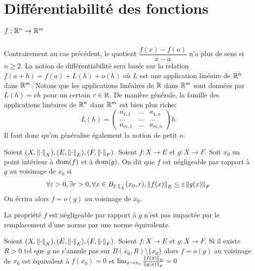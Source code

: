      \section{Différentiabilité des fonctions $f:\mathbb{R}^n\to\mathbb{R}^m$} 
     Contrairement au cas précédent, le quotient $\dfrac{f(x)-f(a)}{x-a}$ n'a plus de sens si $n\geq 2$.
     La notion de différentiabilité sera basée sur la relation $f(a+h) = f(a)+ L(h)+ o(h)$ où $L$ est une application linéaire de $\mathbb{R}^n$ dans $\mathbb{R}^m$.
     Notons que les applications linéaires de $\mathbb{R}$ dans $\mathbb{R}^m$ sont données par $L(h) = ch$ pour un certain $c\in\mathbb{R}$.
     De manière générale, la famille des applications linéaires de $\mathbb{R}^n$ dans $\mathbb{R}^m$ est bien plus riche:
     $$L(h) = \begin{pmatrix}
         a_{1,1} & \dots & a_{1,n}\\
         \dots & \dots & \dots\\
         a_{m,1} & \dots & a_{m,n}
     \end{pmatrix}h$$
     Il faut donc qu'on généralise également la notion de petit $o$.
     \begin{definition}
         Soient $(X,\left\| \cdot \right\|_X),(E,\left\| \cdot \right\|_E),(F,\left\| \cdot \right\|_F)$. Soient $f:X\to E$ et $g:X\to F$. Soit $x_0$ un point intérieur à $\operatorname{dom}(f)$ et à $\operatorname{dom}(g)$.
         On dit que $f$ est négligeable par rapport à $g$ au voisinage de $x_0$ si $$\forall \varepsilon>0, \exists r >0, \forall x\in B_{\left\| \cdot \right\|_X}(x_0, r), \left\| f(x) \right\|_E\leq \varepsilon\left\| g(x) \right\|_F$$
         On écrira alors $f=o(g)$ au voisinage de $x_0$.
    \end{definition}
    \begin{remarque}
        La propriété \og $f$ est négligeable par rapport à $g$ \fg n'est pas impactée par le remplacement d'une norme par une norme équivalente.
    \end{remarque}
     \begin{proposition}
         Soient $(X,\left\| \cdot \right\|_X),(E,\left\| \cdot \right\|_E),(F,\left\| \cdot \right\|_F)$. Soient $f:X\to E$ et $g:X\to F$.  Si il existe $R>0$ tel que $g$ ne s'annule pas sur $B(x_0, 
         R)\setminus\{x_0\}$ alors $f=o(g)$ au voisinage de $x_0$ est équivalent à $f(x_0)=0$ et $\lim_{x\to x_0} \frac{\left\| f(x) \right\|_E}{\left\| g(x) \right\|_F}=0$ 
     \end{proposition}
